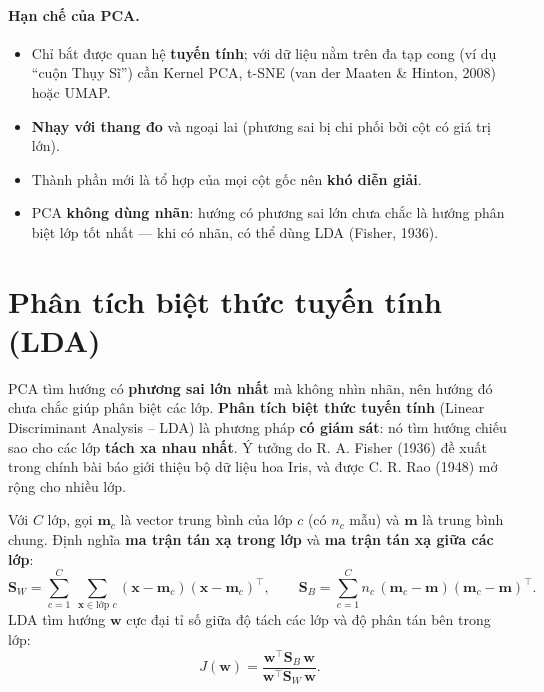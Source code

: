 \paragraph{Hạn chế của PCA.}
\begin{itemize}
    \item Chỉ bắt được quan hệ \textbf{tuyến tính}; với dữ liệu nằm trên đa tạp cong (ví dụ ``cuộn Thụy Sĩ'') cần Kernel PCA, t-SNE (van der Maaten \& Hinton, 2008) hoặc UMAP.
    \item \textbf{Nhạy với thang đo} và ngoại lai (phương sai bị chi phối bởi cột có giá trị lớn).
    \item Thành phần mới là tổ hợp của mọi cột gốc nên \textbf{khó diễn giải}.
    \item PCA \textbf{không dùng nhãn}: hướng có phương sai lớn chưa chắc là hướng phân biệt lớp tốt nhất --- khi có nhãn, có thể dùng LDA (Fisher, 1936).
\end{itemize}

\section{Phân tích biệt thức tuyến tính (LDA)}
\label{sec:lda}

PCA tìm hướng có \textbf{phương sai lớn nhất} mà không nhìn nhãn, nên hướng đó chưa chắc giúp phân biệt các lớp. \textbf{Phân tích biệt thức tuyến tính} (Linear Discriminant Analysis -- LDA) là phương pháp \textbf{có giám sát}: nó tìm hướng chiếu sao cho các lớp \textbf{tách xa nhau nhất}. Ý tưởng do R. A. Fisher (1936) đề xuất trong chính bài báo giới thiệu bộ dữ liệu hoa Iris, và được C. R. Rao (1948) mở rộng cho nhiều lớp.


\begin{definition}
Với $C$ lớp, gọi $\mathbf{m}_c$ là vector trung bình của lớp $c$ (có $n_c$ mẫu) và $\mathbf{m}$ là trung bình chung. Định nghĩa \textbf{ma trận tán xạ trong lớp} và \textbf{ma trận tán xạ giữa các lớp}:
\begin{equation}
    \mathbf{S}_W = \sum_{c=1}^{C}\ \sum_{\mathbf{x} \in \text{lớp } c} (\mathbf{x} - \mathbf{m}_c)(\mathbf{x} - \mathbf{m}_c)^\top, \qquad
    \mathbf{S}_B = \sum_{c=1}^{C} n_c\,(\mathbf{m}_c - \mathbf{m})(\mathbf{m}_c - \mathbf{m})^\top .
\end{equation}
LDA tìm hướng $\mathbf{w}$ cực đại tỉ số giữa độ tách các lớp và độ phân tán bên trong lớp:
\begin{equation}
    J(\mathbf{w}) = \frac{\mathbf{w}^\top\mathbf{S}_B\,\mathbf{w}}{\mathbf{w}^\top\mathbf{S}_W\,\mathbf{w}} .
\end{equation}
\end{definition}


